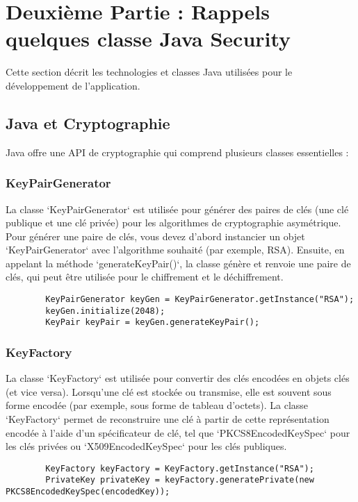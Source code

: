 \documentclass[a4paper,12pt]{report}
\begin{document}
	\chapter{Deuxième Partie : Rappels quelques classe Java Security}
	Cette section décrit les technologies et classes Java utilisées pour le développement de l'application.
	
	\section{Java et Cryptographie}
	Java offre une API de cryptographie qui comprend plusieurs classes essentielles :
	
	\subsection{KeyPairGenerator}
	La classe `KeyPairGenerator` est utilisée pour générer des paires de clés (une clé publique et une clé privée) pour les algorithmes de cryptographie asymétrique. Pour générer une paire de clés, vous devez d'abord instancier un objet `KeyPairGenerator` avec l'algorithme souhaité (par exemple, RSA). Ensuite, en appelant la méthode `generateKeyPair()`, la classe génère et renvoie une paire de clés, qui peut être utilisée pour le chiffrement et le déchiffrement.
	
	\begin{verbatim}
		KeyPairGenerator keyGen = KeyPairGenerator.getInstance("RSA");
		keyGen.initialize(2048);
		KeyPair keyPair = keyGen.generateKeyPair();
	\end{verbatim}
	
	\subsection{KeyFactory}
	La classe `KeyFactory` est utilisée pour convertir des clés encodées en objets clés (et vice versa). Lorsqu'une clé est stockée ou transmise, elle est souvent sous forme encodée (par exemple, sous forme de tableau d'octets). La classe `KeyFactory` permet de reconstruire une clé à partir de cette représentation encodée à l'aide d'un spécificateur de clé, tel que `PKCS8EncodedKeySpec` pour les clés privées ou `X509EncodedKeySpec` pour les clés publiques.
	
	\begin{verbatim}
		KeyFactory keyFactory = KeyFactory.getInstance("RSA");
		PrivateKey privateKey = keyFactory.generatePrivate(new PKCS8EncodedKeySpec(encodedKey));
	\end{verbatim}
	
\end{document}
